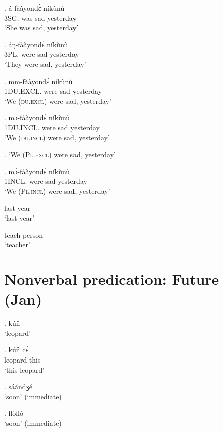 \documentclass{assets/fieldnotes}
\begin{document}
{\exg. á-fààyondɛ̀ níkùnù\\
3SG. was sad yesterday\\
`She was sad, yesterday'

\exg. áŋ-fààyondɛ̀ níkùnù\\
3PL. were sad yesterday\\
`They were sad, yesterday'

\exg. mm-fààyondɛ̀ níkùnù\\ 
1DU.EXCL. were sad yesterday\\
`We (\textsc{du.excl}) were sad, yesterday' %

\exg. mɔ-fààyondɛ̀ níkùnù\\
1DU.INCL. were sad yesterday\\
 `We (\textsc{du.incl}) were sad, yesterday' 

\ex. `We (\textsc{Pl.excl}) were sad, yesterday'

\exg. mɔ́-fààyondɛ̀ níkùnù\\
1INCL. were sad yesterday\\
 `We (\textsc{Pl.incl}) were sad, yesterday'


last year\\
`last year'

teach-person\\
`teacher’\\


\section{Nonverbal predication: Future (Jan)} 


\ex. kúíì \\
`leopard' 


\exg. kúíì cɛ̀ \\
leopard this \\
`this leopard'

\ex. sáándʒé \\
`soon' (immediate)

\ex. flòflò \\
`soon' (immediate)

}
\end{document}
